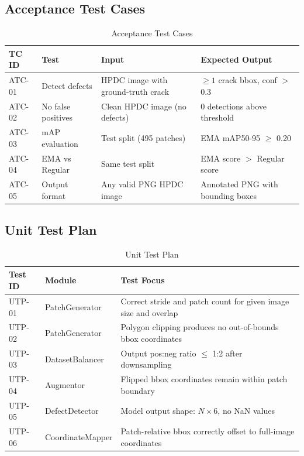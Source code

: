 \subsection*{Acceptance Test Cases}

\begin{table}[H]
\centering
\caption{Acceptance Test Cases}
\begin{tabular}{l p{3.5cm} p{4cm} p{4cm}}
\toprule
\rowcolor{tableHeader}
{\color{white}\bfseries TC ID} &
{\color{white}\bfseries Test} &
{\color{white}\bfseries Input} &
{\color{white}\bfseries Expected Output} \\
\midrule
ATC-01 & Detect defects & HPDC image with ground-truth crack & $\geq 1$ crack bbox, conf $>$ 0.3 \\
\rowcolor{tableRowAlt}
ATC-02 & No false positives & Clean HPDC image (no defects) & 0 detections above threshold \\
ATC-03 & mAP evaluation & Test split (495 patches) & EMA mAP50-95 $\geq$ 0.20 \\
\rowcolor{tableRowAlt}
ATC-04 & EMA vs Regular & Same test split & EMA score $>$ Regular score \\
ATC-05 & Output format & Any valid PNG HPDC image & Annotated PNG with bounding boxes \\
\bottomrule
\end{tabular}
\end{table}

\subsection*{Unit Test Plan}

\begin{table}[H]
\centering
\caption{Unit Test Plan}
\begin{tabular}{l p{3.5cm} p{7cm}}
\toprule
\rowcolor{tableHeader}
{\color{white}\bfseries Test ID} &
{\color{white}\bfseries Module} &
{\color{white}\bfseries Test Focus} \\
\midrule
UTP-01 & PatchGenerator & Correct stride and patch count for given image size and overlap \\
\rowcolor{tableRowAlt}
UTP-02 & PatchGenerator & Polygon clipping produces no out-of-bounds bbox coordinates \\
UTP-03 & DatasetBalancer & Output pos:neg ratio $\leq$ 1:2 after downsampling \\
\rowcolor{tableRowAlt}
UTP-04 & Augmentor & Flipped bbox coordinates remain within patch boundary \\
UTP-05 & DefectDetector & Model output shape: $N \times 6$, no NaN values \\
\rowcolor{tableRowAlt}
UTP-06 & CoordinateMapper & Patch-relative bbox correctly offset to full-image coordinates \\
\bottomrule
\end{tabular}
\end{table}


